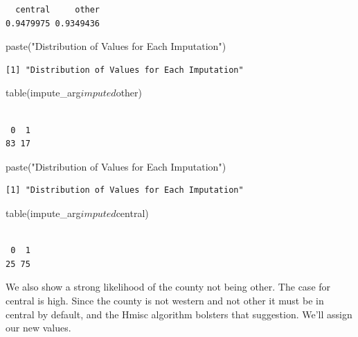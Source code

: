 \documentclass[]{article}
\newenvironment{Shaded}{}{}
\newcommand{\KeywordTok}[1]{\textcolor[rgb]{0.00,0.00,1.00}{#1}}
\newcommand{\NormalTok}[1]{#1}
\newcommand{\OperatorTok}[1]{#1}
\newcommand{\StringTok}[1]{\textcolor[rgb]{0.00,0.50,0.50}{#1}}
\begin{document}
\begin{verbatim}
  central     other 
0.9479975 0.9349436 
\end{verbatim}

\begin{Shaded}
\begin{Highlighting}[]
\KeywordTok{paste}\NormalTok{(}\StringTok{"Distribution of Values for Each Imputation"}\NormalTok{)}
\end{Highlighting}
\end{Shaded}

\begin{verbatim}
[1] "Distribution of Values for Each Imputation"
\end{verbatim}

\begin{Shaded}
\begin{Highlighting}[]
\KeywordTok{table}\NormalTok{(impute_arg}\OperatorTok{$}\NormalTok{imputed}\OperatorTok{$}\NormalTok{other)}
\end{Highlighting}
\end{Shaded}

\begin{verbatim}

 0  1 
83 17 
\end{verbatim}

\begin{Shaded}
\begin{Highlighting}[]
\KeywordTok{paste}\NormalTok{(}\StringTok{"Distribution of Values for Each Imputation"}\NormalTok{)}
\end{Highlighting}
\end{Shaded}

\begin{verbatim}
[1] "Distribution of Values for Each Imputation"
\end{verbatim}

\begin{Shaded}
\begin{Highlighting}[]
\KeywordTok{table}\NormalTok{(impute_arg}\OperatorTok{$}\NormalTok{imputed}\OperatorTok{$}\NormalTok{central)}
\end{Highlighting}
\end{Shaded}

\begin{verbatim}

 0  1 
25 75 
\end{verbatim}

We also show a strong likelihood of the county not being other. The case
for central is high. Since the county is not western and not other it
must be in central by default, and the Hmisc algorithm bolsters that
suggestion. We'll assign our new values.
\end{document}
